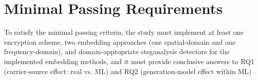 \documentclass[10pt,twocolumn,a4paper]{article}
\begin{document}
\section{Minimal Passing Requirements}

To satisfy the minimal passing criteria, the study must implement at least one encryption scheme, two embedding approaches (one spatial-domain and one frequency-domain), and domain-appropriate steganalysis detectors for the implemented embedding methods, and it must provide conclusive answers to RQ1 (carrier-source effect: real vs. ML) and RQ2 (generation-model effect within ML)

\clearpage
\renewcommand{\refname}{References}
\end{document}

